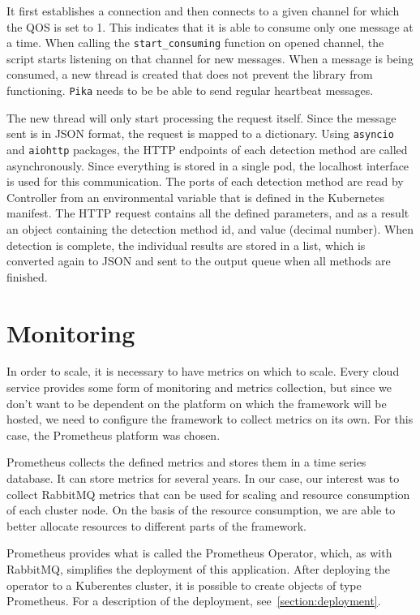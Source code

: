 It first establishes a connection and then connects to a given channel for which the QOS is set to 1. This indicates that it is able to consume only one message at a time. When calling the \texttt{start\_consuming} function on opened channel, the script starts listening on that channel for new messages. When a message is being consumed, a new thread is created that does not prevent the library from functioning. \texttt{Pika} needs to be be able to send regular heartbeat messages.~\cite{Pika}

The new thread will only start processing the request itself. Since the message sent is in JSON format, the request is mapped to a dictionary. Using \texttt{asyncio} and \texttt{aiohttp} packages, the HTTP endpoints of each detection method are called asynchronously. Since everything is stored in a single pod, the localhost interface is used for this communication. The ports of each detection method are read by Controller from an environmental variable that is defined in the Kubernetes manifest. The HTTP request contains all the defined parameters, and as a result an object containing the detection method id, and value (decimal number). When detection is complete, the individual results are stored in a list, which is converted again to JSON and sent to the output queue when all methods are finished.

\section{Monitoring}
In order to scale, it is necessary to have metrics on which to scale. Every cloud service provides some form of monitoring and metrics collection, but since we don't want to be dependent on the platform on which the framework will be hosted, we need to configure the framework to collect metrics on its own. For this case, the Prometheus platform was chosen.

Prometheus collects the defined metrics and stores them in a time series database. It can store metrics for several years. In our case, our interest was to collect RabbitMQ metrics that can be used for scaling and resource consumption of each cluster node. On the basis of the resource consumption, we are able to better allocate resources to different parts of the framework. 

Prometheus provides what is called the Prometheus Operator, which, as with RabbitMQ, simplifies the deployment of this application. After deploying the operator to a Kuberentes cluster, it is possible to create objects of type Prometheus. For a description of the deployment, see~\ref{section:deployment}.~\cite{PrometheusOperator}

